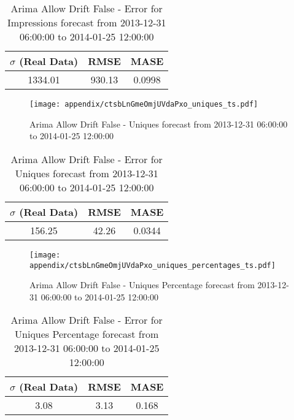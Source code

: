 \begin{table}[H]
\centering
\footnotesize
\begin{tabular}{ccc}
$\sigma$ (Real Data) & RMSE & MASE   \\ \hline
1334.01 & 930.13 & 0.0998 \\
\end{tabular}

\vspace{0.5cm}

\caption{
Arima Allow Drift False - Error for Impressions forecast from 2013-12-31 06:00:00 to 2014-01-25 12:00:00}
\end{table}

\begin{figure}[H] \begin{center} \leavevmode
\texttt{[image: appendix/ctsbLnGmeOmjUVdaPxo\_uniques\_ts.pdf]} \caption{
Arima Allow Drift False - Uniques forecast from 2013-12-31 06:00:00 to 2014-01-25 12:00:00} \label{fig:appendix/ctsbLnGmeOmjUVdaPxo_uniques_ts.pdf} \end{center}
\end{figure}

\begin{table}[H]
\centering
\footnotesize
\begin{tabular}{ccc}
$\sigma$ (Real Data) & RMSE & MASE   \\ \hline
156.25 & 42.26 & 0.0344 \\
\end{tabular}

\vspace{0.5cm}

\caption{
Arima Allow Drift False - Error for Uniques forecast from 2013-12-31 06:00:00 to 2014-01-25 12:00:00}
\end{table}

\begin{figure}[H] \begin{center} \leavevmode
\texttt{[image: appendix/ctsbLnGmeOmjUVdaPxo\_uniques\_percentages\_ts.pdf]} \caption{
Arima Allow Drift False - Uniques Percentage forecast from 2013-12-31 06:00:00 to 2014-01-25 12:00:00} \label{fig:appendix/ctsbLnGmeOmjUVdaPxo_uniques_percentages_ts.pdf} \end{center}
\end{figure}

\begin{table}[H]
\centering
\footnotesize
\begin{tabular}{ccc}
$\sigma$ (Real Data) & RMSE & MASE   \\ \hline
3.08 & 3.13 & 0.168 \\
\end{tabular}

\vspace{0.5cm}

\caption{
Arima Allow Drift False - Error for Uniques Percentage forecast from 2013-12-31 06:00:00 to 2014-01-25 12:00:00}
\end{table}

